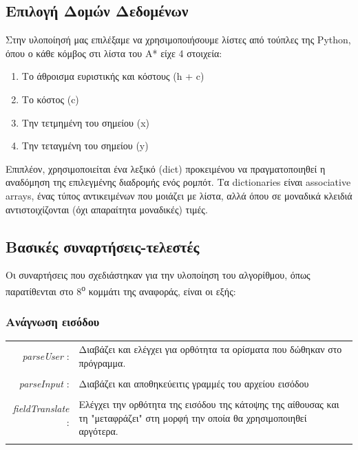 \documentclass[a4paper,9pt]{article}
\begin{document}


\subsection{Επιλογή Δομών Δεδομένων}
Στην υλοποίησή μας επιλέξαμε να χρησιμοποιήσουμε λίστες από τούπλες της Python,
όπου ο κάθε κόμβος στι λίστα του A* είχε 4 στοιχεία:
\begin{enumerate}
    \item Το άθροισμα ευριστικής και κόστους (h + c)
    \item Το κόστος (c)
    \item Την τετμημένη του σημείου (x)
    \item Την τεταγμένη του σημείου (y)
\end{enumerate}

Επιπλέον, χρησιμοποιείται ένα λεξικό (dict) προκειμένου να
πραγματοποιηθεί η αναδόμηση της επιλεγμένης διαδρομής ενός ρομπότ. Τα
dictionaries είναι associative arrays, ένας τύπος αντικειμένων που μοιάζει με
λίστα, αλλά όπου σε μοναδικά κλειδιά αντιστοιχίζονται (όχι απαραίτητα
μοναδικές) τιμές.



\subsection{Βασικές συναρτήσεις-τελεστές}
Οι συναρτήσεις που σχεδιάστηκαν για την υλοποίηση του αλγορίθμου, όπως
παρατίθενται στο 8\textsuperscript{ο} κομμάτι της αναφοράς, είναι οι εξής:
\subsubsection{Ανάγνωση εισόδου}
\begin{tabular}{r l}
    \emph{parseUser} :& Διαβάζει και ελέγχει για ορθότητα τα ορίσματα
        που δώθηκαν στο πρόγραμμα.\\
        &\\
    \emph{parseInput} :& Διαβάζει και αποθηκεύειτις γραμμές του αρχείου
        εισόδου\\
        &\\
        \emph{fieldTranslate} :&\multirow{2}{10cm}{Ελέγχει την ορθότητα της εισόδου της
        κάτοψης της αίθουσας και τη "μεταφράζει" στη μορφή την οποία θα
        χρησιμοποιηθεί αργότερα.}\\
        &\\&\\
\end{tabular}
\end{document}
